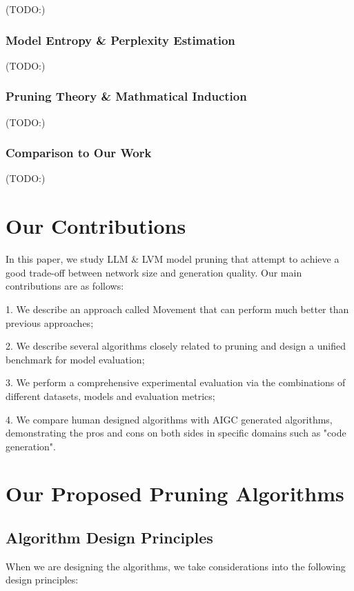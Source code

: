 \documentclass{article} %
\begin{document}
(TODO:)

\subsubsection{Model Entropy \& Perplexity Estimation}

(TODO:)

\subsubsection{Pruning Theory \& Mathmatical Induction}

(TODO:)

\subsubsection{Comparison to Our Work}

(TODO:)

\section{Our Contributions}
\label{contribution}

In this paper, we study LLM \& LVM model pruning that attempt to achieve a good trade-off between network size and generation quality. Our main contributions are as follows:

1. We describe an approach called Movement that can perform much better than previous approaches;

2. We describe several algorithms closely related to pruning and design a unified benchmark for model evaluation;

3. We perform a comprehensive experimental evaluation via the combinations of different datasets, models and evaluation metrics;

4. We compare human designed algorithms with AIGC generated algorithms, demonstrating the pros and cons on both sides in specific domains such as "code generation".

\section{Our Proposed Pruning Algorithms}
\label{ours}
\subsection{Algorithm Design Principles}
When we are designing the algorithms, we take considerations into the following design principles:
\end{document}
